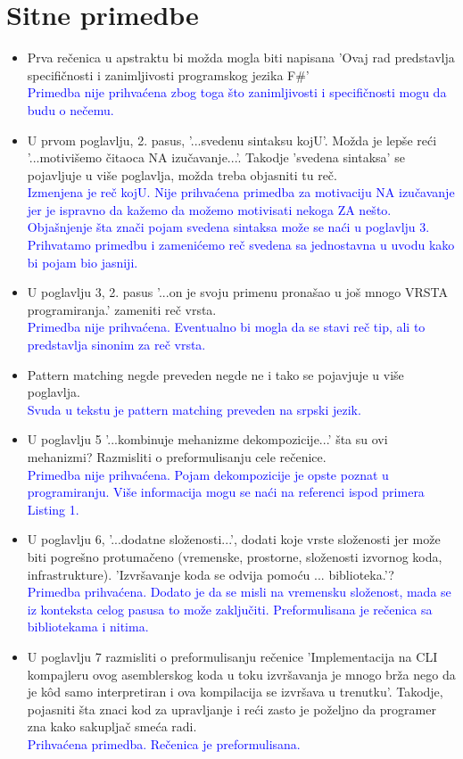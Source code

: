 \documentclass[a4paper]{report}
\newcommand{\odgovor}[1]{\textcolor{blue}{#1}}
\begin{document}
\section{Sitne primedbe}
\begin{itemize}
\item Prva rečenica u apstraktu bi možda mogla biti napisana 'Ovaj rad predstavlja specifičnosti i zanimljivosti programskog jezika F\#'
\\ \odgovor{Primedba nije prihvaćena zbog toga što zanimljivosti i specifičnosti mogu da budu o nečemu.}
\item U prvom poglavlju, 2. pasus, '...svedenu sintaksu kojU'. Možda je lepše reći '...motivišemo čitaoca NA izučavanje...'.
Takodje 'svedena sintaksa' se pojavljuje u više poglavlja, možda treba objasniti tu reč.
\\ \odgovor{Izmenjena  je reč kojU. Nije prihvaćena primedba za motivaciju NA izučavanje jer je ispravno da kažemo da možemo motivisati nekoga ZA nešto. Objašnjenje šta znači pojam svedena sintaksa može se naći u poglavlju 3. Prihvatamo primedbu i zamenićemo reč svedena sa jednostavna u uvodu kako bi pojam bio jasniji.}
\item U poglavlju 3, 2. pasus '...on je svoju primenu pronašao u još mnogo VRSTA programiranja.' zameniti reč vrsta.
\\ \odgovor{Primedba nije prihvaćena. Eventualno bi mogla da se stavi reč tip, ali to predstavlja sinonim za reč vrsta.}
\item Pattern matching negde preveden negde ne i tako se pojavjuje u više poglavlja.
\\ \odgovor{Svuda u tekstu je pattern matching preveden na srpski jezik.}
\item U poglavlju 5 '...kombinuje mehanizme dekompozicije...' šta su ovi mehanizmi? Razmisliti o preformulisanju cele rečenice.
\\ \odgovor{Primedba nije prihvaćena. Pojam dekompozicije je opste poznat u programiranju. Više informacija mogu se naći na referenci ispod primera Listing 1.}
\item U poglavlju 6, '...dodatne složenosti...', dodati koje vrste složenosti jer može biti pogrešno protumačeno (vremenske, prostorne, složenosti izvornog koda, infrastrukture). 'Izvršavanje koda se odvija pomoću ... biblioteka.'?
\\ \odgovor{Primedba prihvaćena. Dodato je da se misli na vremensku složenost, mada se iz konteksta celog pasusa to može zaključiti. Preformulisana je rečenica sa bibliotekama i nitima. }
\item U poglavlju 7 razmisliti o preformulisanju rečenice 'Implementacija na CLI kompajleru ovog asemblerskog koda u toku izvršavanja je mnogo brža nego da je kôd samo interpretiran i ova kompilacija se izvršava u trenutku'. Takodje, pojasniti šta znaci kod za upravljanje i reći zasto je poželjno da programer zna kako sakupljač smeća radi.
\\ \odgovor{Prihvaćena primedba. Rečenica je preformulisana. }
 

\end{itemize}
\end{document}
